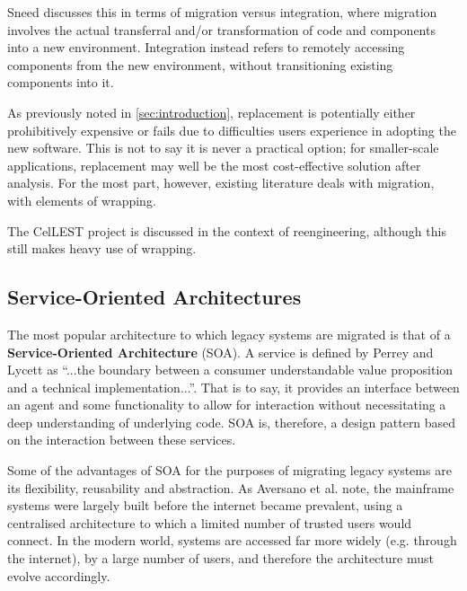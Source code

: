 \documentclass[12pt,journal,compsoc]{IEEEtran}
\begin{document}
Sneed\cite{Sneed2009} discusses this in terms of migration versus integration, where migration involves the actual transferral and/or transformation of code and components into a new environment. Integration instead refers to remotely accessing components from the new environment, without transitioning existing components into it.

As previously noted in \ref{sec:introduction}, replacement is potentially either prohibitively expensive\cite{Duncan1996} or fails due to difficulties users experience in adopting the new software\cite{Sneed2011}. This is not to say it is never a practical option; for smaller-scale applications, replacement may well be the most cost-effective solution after analysis. For the most part, however, existing literature deals with migration\cite{Aversano2001,Bodhuin2002,Canfora2006,Canfora2000,Canfora2008,Lucia1997,Lewis2006,Sneed2011,Sneed2008,Sneed2009,Sneed2013,Wu2005,Sneed1996,Duncan1996}, with elements of wrapping\cite{Chiang2001,Canfora2008,Sneed1996}.

The CelLEST project\cite{Stroulia2002} is discussed in the context of reengineering, although this still makes heavy use of wrapping.

\subsection{Service-Oriented Architectures}
\label{subsec:soa}
The most popular architecture to which legacy systems are migrated is that of a \textbf{Service-Oriented Architecture} (SOA)\cite{Sneed2008,Almonaies2010,Koschel2009,Canfora2006,Sneed2009,Canfora2008}. A service is defined by Perrey and Lycett\cite{Perrey2003} as ``...the boundary between a consumer understandable value proposition and a technical implementation...''. That is to say, it provides an interface between an agent and some functionality to allow for interaction without necessitating a deep understanding of underlying code. SOA is, therefore, a design pattern based on the interaction between these services.

Some of the advantages of SOA for the purposes of migrating legacy systems are its flexibility, reusability and abstraction\cite{Almonaies2010}. As Aversano et al. note\cite{Aversano2001}, the mainframe systems were largely built before the internet became prevalent, using a centralised architecture to which a limited number of trusted users would connect. In the modern world, systems are accessed far more widely (e.g. through the internet), by a large number of users, and therefore the architecture must evolve accordingly.
\end{document}
